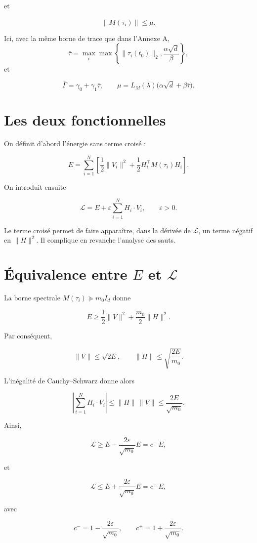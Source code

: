 et

\[
\|\dot M(\tau_i)\|
\leq
\mu.
\]

Ici, avec la même borne de trace que dans l'Annexe A,
\[
\bar\tau
=
\max_i\max\left\{\|\tau_i(t_0)\|_2,
\frac{\alpha\sqrt d}{\beta}\right\},
\]
et

\[
\bar\Gamma
=
\gamma_0+\gamma_1\bar\tau,
\qquad
\mu
=
L_M(\lambda)
\bigl(\alpha\sqrt d+\beta\bar\tau\bigr).
\]

\section{Les deux fonctionnelles}\label{annexe-energie-deux-fonctionnelles}

On définit d'abord l'énergie sans terme croisé :

\[
E
=
\sum_{i=1}^N
\left[
\frac12\|V_i\|^2
+
\frac12H_i^\top M(\tau_i)H_i
\right].
\]

On introduit ensuite

\[
\mathcal L
=
E
+
\varepsilon
\sum_{i=1}^N H_i\cdot V_i,
\qquad
\varepsilon>0.
\]

Le terme croisé permet de faire apparaître, dans la dérivée de
\(\mathcal L\), un terme négatif en \(\|H\|^2\). Il complique en
revanche l'analyse des sauts.

\section{Équivalence entre \texorpdfstring{$E$}{E} et \texorpdfstring{$\mathcal L$}{L}}
\label{annexe-energie-equivalence}

La borne spectrale \(M(\tau_i)\succeq m_0I_d\) donne

\[
E
\geq
\frac12\|V\|^2
+
\frac{m_0}{2}\|H\|^2.
\]

Par conséquent,

\[
\|V\|
\leq
\sqrt{2E},
\qquad
\|H\|
\leq
\sqrt{\frac{2E}{m_0}}.
\]

L'inégalité de Cauchy--Schwarz donne alors

\[
\left|
\sum_{i=1}^N H_i\cdot V_i
\right|
\leq
\|H\|\,\|V\|
\leq
\frac{2E}{\sqrt{m_0}}.
\]

Ainsi,

\[
\mathcal L
\geq
E-\frac{2\varepsilon}{\sqrt{m_0}}E
=
c^{-}\,E,
\]

et

\[
\mathcal L
\leq
E+\frac{2\varepsilon}{\sqrt{m_0}}E
=
c^{+}\,E,
\]

avec

\[
c^{-}
=
1-\frac{2\varepsilon}{\sqrt{m_0}},
\qquad
c^{+}
=
1+\frac{2\varepsilon}{\sqrt{m_0}}.
\]

